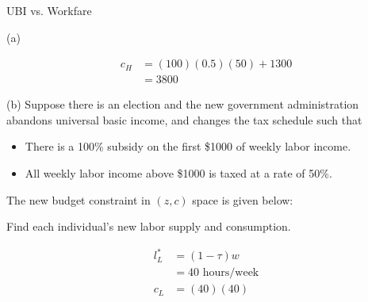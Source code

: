 \documentclass[10pt]{extarticle}
\begin{document}
\begin{problem}{UBI vs. Workfare}
\begin{problem}{(a)}
\begin{description}[font=\normalfont]
\begin{align*}
            c_{H} &= (100)(0.5)(50) + 1300\\
                  &= 3800
          \end{align*}
      \end{description}
    \end{problem}
    \begin{problem}{(b)}
      Suppose there is an election and the new government administration abandons universal basic income, and changes the tax schedule such that
      \begin{itemize}
        \item There is a 100\% subsidy on the first \$1000 of weekly labor income.
        \item All weekly labor income above \$1000 is taxed at a rate of 50\%.
      \end{itemize}
      The new budget constraint in $(z,c)$ space is given below:
      \begin{center}
      \end{center}
      Find each individual's new labor supply and consumption.
      \tcblower
      \begin{description}[font=\normalfont]
        \item[Laura's Labor Supply and Consumption:]
          \begin{align*}
            l^{\ast}_{L} &= (1-\tau)w\\
                     &= 40\text{ hours/week}\\
            c_{L} &= (40)(40)\\

\end{align*}
\end{description}
\end{problem}
\end{problem}
\end{document}
